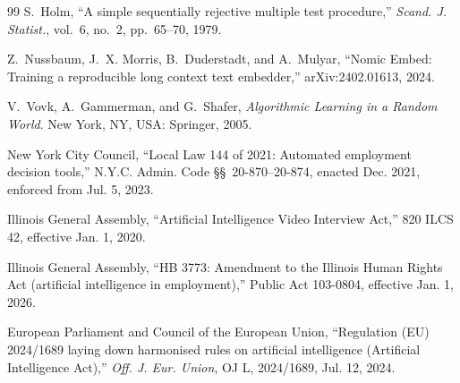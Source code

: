 \documentclass[conference,a4paper]{IEEEtran}
\begin{document}
\begin{thebibliography}{99}
S.~Holm, ``A simple sequentially rejective multiple test procedure,''
\emph{Scand. J. Statist.}, vol.~6, no.~2, pp.~65--70, 1979.

Z.~Nussbaum, J.~X. Morris, B.~Duderstadt, and A.~Mulyar, ``Nomic Embed:
Training a reproducible long context text embedder,'' arXiv:2402.01613, 2024.

V.~Vovk, A.~Gammerman, and G.~Shafer, \emph{Algorithmic Learning in a Random
World}. New York, NY, USA: Springer, 2005.

New York City Council, ``Local Law 144 of 2021: Automated employment decision
tools,'' N.Y.C. Admin. Code \S\S~20-870--20-874, enacted Dec. 2021, enforced
from Jul. 5, 2023.

Illinois General Assembly, ``Artificial Intelligence Video Interview Act,''
820 ILCS 42, effective Jan. 1, 2020.

Illinois General Assembly, ``HB 3773: Amendment to the Illinois Human Rights
Act (artificial intelligence in employment),'' Public Act 103-0804, effective
Jan. 1, 2026.

European Parliament and Council of the European Union, ``Regulation (EU)
2024/1689 laying down harmonised rules on artificial intelligence (Artificial
Intelligence Act),'' \emph{Off. J. Eur. Union}, OJ L, 2024/1689, Jul. 12, 2024.

\end{thebibliography}
\end{document}
